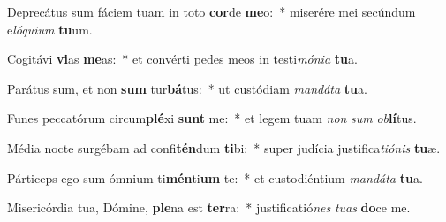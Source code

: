 \item Deprecátus sum fáciem tuam in toto \textbf{cor}de \textbf{me}o:~* miserére mei secúndum e\textit{ló}\textit{qui}\textit{um} \textbf{tu}um.
\item Cogitávi \textbf{vi}as \textbf{me}as:~* et convérti pedes meos in testi\textit{mó}\textit{ni}\textit{a} \textbf{tu}a.
\item Parátus sum, et non \textbf{sum} tur\textbf{bá}tus:~* ut custódiam \textit{man}\textit{dá}\textit{ta} \textbf{tu}a.
\item Funes peccatórum circum\textbf{plé}xi \textbf{sunt} me:~* et legem tuam \textit{non} \textit{sum} \textit{ob}\textbf{lí}tus.
\item Média nocte surgébam ad confi\textbf{tén}dum \textbf{ti}bi:~* super judícia justifica\textit{ti}\textit{ó}\textit{nis} \textbf{tu}æ.
\item Párticeps ego sum ómnium ti\textbf{mén}ti\textbf{um} te:~* et custodiéntium \textit{man}\textit{dá}\textit{ta} \textbf{tu}a.
\item Misericórdia tua, Dómine, \textbf{ple}na est \textbf{ter}ra:~* justificatió\textit{nes} \textit{tu}\textit{as} \textbf{do}ce me.
